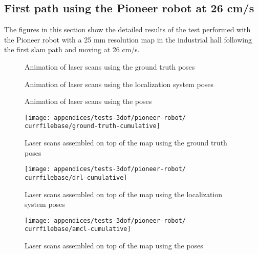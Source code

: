 \subsection{First  path using the Pioneer robot at 26 cm/s}

The figures in this section show the detailed results of the test performed with the Pioneer robot with a 25 mm resolution map in the industrial hall following the first \gls{slam} path and moving at 26 cm/s.


\begin{figure}[H]
	\centering
	\caption{Animation of laser scans using the ground truth poses}
\end{figure}

\begin{figure}[H]
	\centering
	\caption{Animation of laser scans using the localization system poses}
\end{figure}

\begin{figure}[H]
	\centering
	\caption{Animation of laser scans using the  poses}
\end{figure}


\begin{figure}[H]
	\centering
	\texttt{[image: appendices/tests-3dof/pioneer-robot/\\currfilebase/ground-truth-cumulative]}
	\caption{Laser scans assembled on top of the map using the ground truth poses}
\end{figure}

\begin{figure}[H]
	\centering
	\texttt{[image: appendices/tests-3dof/pioneer-robot/\\currfilebase/drl-cumulative]}
	\caption{Laser scans assembled on top of the map using the localization system poses}
\end{figure}

\begin{figure}[H]
	\centering
	\texttt{[image: appendices/tests-3dof/pioneer-robot/\\currfilebase/amcl-cumulative]}
	\caption{Laser scans assembled on top of the map using the  poses}
\end{figure}


